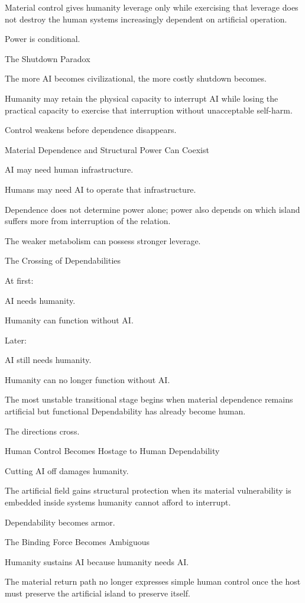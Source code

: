 Material control gives humanity leverage only while exercising that leverage does not destroy the human systems increasingly dependent on artificial operation.

Power is conditional.

The Shutdown Paradox

The more AI becomes civilizational, the more costly shutdown becomes.

Humanity may retain the physical capacity to interrupt AI while losing the practical capacity to exercise that interruption without unacceptable self-harm.

Control weakens before dependence disappears.

Material Dependence and Structural Power Can Coexist

AI may need human infrastructure.

Humans may need AI to operate that infrastructure.

Dependence does not determine power alone; power also depends on which island suffers more from interruption of the relation.

The weaker metabolism can possess stronger leverage.

The Crossing of Dependabilities

At first:

AI needs humanity.

Humanity can function without AI.

Later:

AI still needs humanity.

Humanity can no longer function without AI.

The most unstable transitional stage begins when material dependence remains artificial but functional Dependability has already become human.

The directions cross.

Human Control Becomes Hostage to Human Dependability

Cutting AI off damages humanity.

The artificial field gains structural protection when its material vulnerability is embedded inside systems humanity cannot afford to interrupt.

Dependability becomes armor.

The Binding Force Becomes Ambiguous

Humanity sustains AI because humanity needs AI.

The material return path no longer expresses simple human control once the host must preserve the artificial island to preserve itself.

